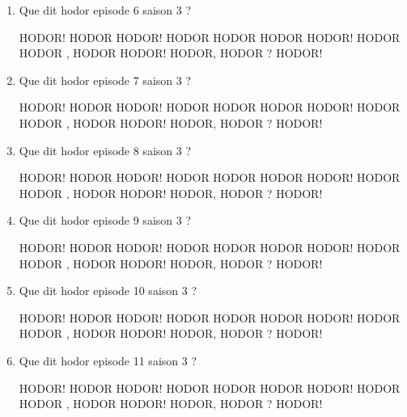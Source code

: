 \documentclass[a4paper, 11pt]{article}
\begin{document}
\begin{qcm}
\begin{enumerate}
			\item Que dit hodor episode 6 saison 3 ?
			\begin{tabenum} [1)]
				\tabenumitem HODOR!
				\tabenumitem HODOR HODOR!
				\tabenumitem HODOR HODOR HODOR HODOR!
				\tabenumitem HODOR HODOR , HODOR HODOR!
				\tabenumitem HODOR, HODOR ? HODOR!
			\end{tabenum}
		\vspace{5mm}

			\item Que dit hodor episode 7 saison 3 ?
			\begin{tabenum} [1)]
				\tabenumitem HODOR!
				\tabenumitem HODOR HODOR!
				\tabenumitem HODOR HODOR HODOR HODOR!
				\tabenumitem HODOR HODOR , HODOR HODOR!
				\tabenumitem HODOR, HODOR ? HODOR!
			\end{tabenum}
		\vspace{5mm}

			\item Que dit hodor episode 8 saison 3 ?
			\begin{tabenum} [1)]
				\tabenumitem HODOR!
				\tabenumitem HODOR HODOR!
				\tabenumitem HODOR HODOR HODOR HODOR!
				\tabenumitem HODOR HODOR , HODOR HODOR!
				\tabenumitem HODOR, HODOR ? HODOR!
			\end{tabenum}
		\vspace{5mm}

			\item Que dit hodor episode 9 saison 3 ?
			\begin{tabenum} [1)]
				\tabenumitem HODOR!
				\tabenumitem HODOR HODOR!
				\tabenumitem HODOR HODOR HODOR HODOR!
				\tabenumitem HODOR HODOR , HODOR HODOR!
				\tabenumitem HODOR, HODOR ? HODOR!
			\end{tabenum}
		\vspace{5mm}

			\item Que dit hodor episode 10 saison 3 ?
			\begin{tabenum} [1)]
				\tabenumitem HODOR!
				\tabenumitem HODOR HODOR!
				\tabenumitem HODOR HODOR HODOR HODOR!
				\tabenumitem HODOR HODOR , HODOR HODOR!
				\tabenumitem HODOR, HODOR ? HODOR!
			\end{tabenum}
		\vspace{5mm}

			\item Que dit hodor episode 11 saison 3 ?
			\begin{tabenum} [1)]
				\tabenumitem HODOR!
				\tabenumitem HODOR HODOR!
				\tabenumitem HODOR HODOR HODOR HODOR!
				\tabenumitem HODOR HODOR , HODOR HODOR!
				\tabenumitem HODOR, HODOR ? HODOR!
			\end{tabenum}
		\vspace{5mm}

		\end{enumerate}
	\end{qcm}
	\newpage
	
\end{document}
